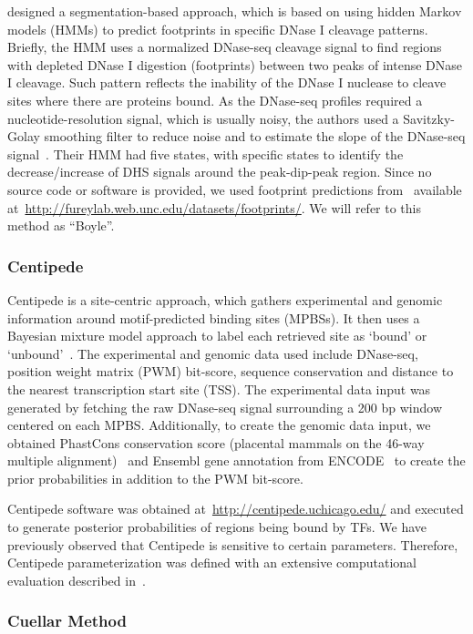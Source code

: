 \documentclass[11pt]{article}
\begin{document}
\cite{boyle2011} designed a segmentation-based approach, which is based on using hidden Markov models (HMMs) to predict footprints in specific DNase I cleavage patterns. Briefly, the HMM uses a normalized DNase-seq cleavage signal to find regions with depleted DNase I digestion (footprints) between two peaks of intense DNase I cleavage. Such pattern reflects the inability of the DNase I nuclease to cleave sites where there are proteins bound. As the DNase-seq profiles required a nucleotide-resolution signal, which is usually noisy, the authors used a Savitzky-Golay smoothing filter to reduce noise and to estimate the slope of the DNase-seq signal~\citep{madden1978}. Their HMM had five states, with specific states to identify the decrease/increase of DHS signals around the peak-dip-peak region. Since no source code or software is provided, we used footprint predictions from~\cite{boyle2011} available at~\url{http://fureylab.web.unc.edu/datasets/footprints/}. We will refer to this method as ``Boyle''.

\subsubsection{Centipede}
\label{sec:centipede}

Centipede is a site-centric approach, which gathers experimental and genomic information around motif-predicted binding sites (MPBSs). It then uses a Bayesian mixture model approach to label each retrieved site as `bound' or `unbound'~\citep{pique2011}. The experimental and genomic data used include DNase-seq, position weight matrix (PWM) bit-score, sequence conservation and distance to the nearest transcription start site (TSS). The experimental data input was generated by fetching the raw DNase-seq signal surrounding a 200 bp window centered on each MPBS. Additionally, to create the genomic data input, we obtained PhastCons conservation score (placental mammals on the 46-way multiple alignment)~\citep{siepel2005} and Ensembl gene annotation from ENCODE~\citep{hubbard2002} to create the prior probabilities in addition to the PWM bit-score. 

Centipede software was obtained at~\url{http://centipede.uchicago.edu/} and executed to generate posterior probabilities of regions being bound by TFs. We have previously observed that Centipede is sensitive to certain parameters. Therefore, Centipede parameterization was defined with an extensive computational evaluation described in~\cite{gusmao2014}.

\subsubsection{Cuellar Method}
\label{sec:cuellar}
\end{document}
